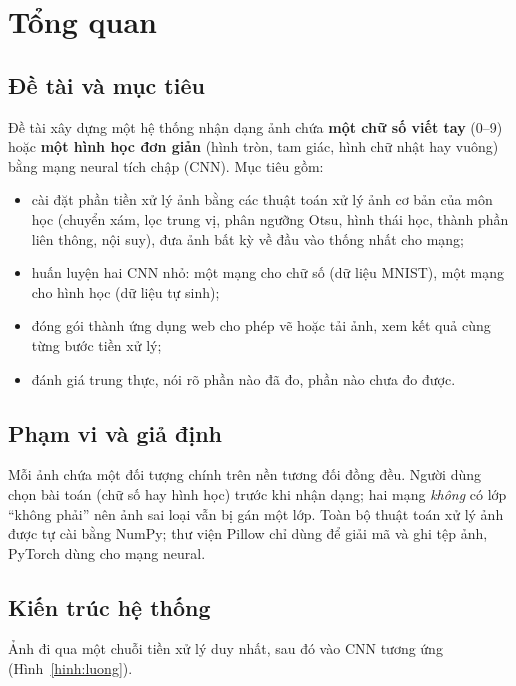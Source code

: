\chapter{Tổng quan}

\section{Đề tài và mục tiêu}
Đề tài xây dựng một hệ thống nhận dạng ảnh chứa \textbf{một chữ số viết tay} (0--9) hoặc \textbf{một hình học đơn giản}
(hình tròn, tam giác, hình chữ nhật hay vuông) bằng mạng neural tích chập (CNN). Mục tiêu gồm:
\begin{itemize}
\item cài đặt phần tiền xử lý ảnh bằng các thuật toán xử lý ảnh cơ bản của môn học (chuyển xám, lọc trung vị, phân ngưỡng Otsu,
hình thái học, thành phần liên thông, nội suy), đưa ảnh bất kỳ về đầu vào thống nhất cho mạng;
\item huấn luyện hai CNN nhỏ: một mạng cho chữ số (dữ liệu MNIST), một mạng cho hình học (dữ liệu tự sinh);
\item đóng gói thành ứng dụng web cho phép vẽ hoặc tải ảnh, xem kết quả cùng từng bước tiền xử lý;
\item đánh giá trung thực, nói rõ phần nào đã đo, phần nào chưa đo được.
\end{itemize}

\section{Phạm vi và giả định}
Mỗi ảnh chứa một đối tượng chính trên nền tương đối đồng đều. Người dùng chọn bài toán (chữ số hay hình học) trước khi nhận dạng; hai mạng
\emph{không} có lớp ``không phải'' nên ảnh sai loại vẫn bị gán một lớp. Toàn bộ thuật toán xử lý ảnh được tự cài bằng NumPy; thư viện Pillow chỉ
dùng để giải mã và ghi tệp ảnh, PyTorch dùng cho mạng neural.

\section{Kiến trúc hệ thống}
Ảnh đi qua một chuỗi tiền xử lý duy nhất, sau đó vào CNN tương ứng (Hình~\ref{hinh:luong}).

